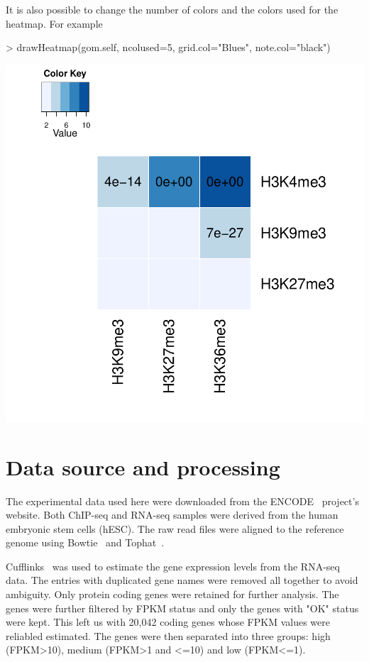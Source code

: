 \documentclass{article}
\begin{document}
It is also possible to change the number of colors and the colors used for the heatmap. For example
\begin{Schunk}
\begin{Sinput}
> drawHeatmap(gom.self, ncolused=5, grid.col="Blues", note.col="black")
\end{Sinput}
\end{Schunk}
\includegraphics{GeneOverlap-020}


\section{Data source and processing} \label{sec:data}
The experimental data used here were downloaded from the ENCODE~\cite{ENCODE} project's website. Both ChIP-seq and RNA-seq samples were derived from the human embryonic stem cells (hESC). The raw read files were aligned to the reference genome using Bowtie~\cite{Bowtie} and Tophat~\cite{Tophat}. 

Cufflinks~\cite{Cufflinks} was used to estimate the gene expression levels from the RNA-seq data. The entries with duplicated gene names were removed all together to avoid ambiguity. Only protein coding genes were retained for further analysis. The genes were further filtered by FPKM status and only the genes with "OK" status were kept. This left us with 20,042 coding genes whose FPKM values were reliabled estimated. The genes were then separated into three groups: high (FPKM>10), medium (FPKM>1 and <=10) and low (FPKM<=1). 
\end{document}
